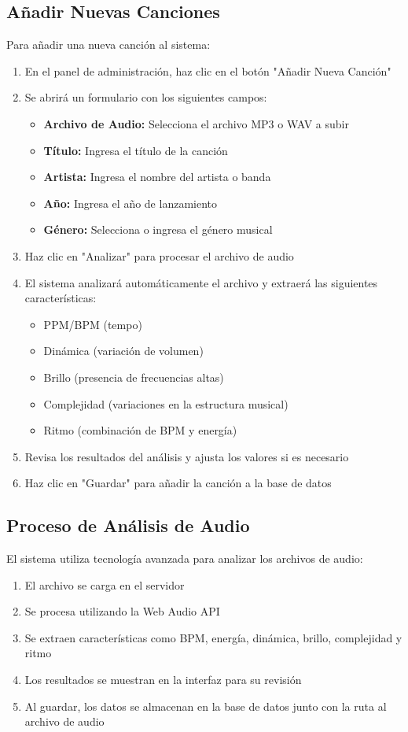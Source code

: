\documentclass[a4paper,12pt]{article}
\begin{document}
\subsection{Añadir Nuevas Canciones}
Para añadir una nueva canción al sistema:
\begin{enumerate}
  \item En el panel de administración, haz clic en el botón "Añadir Nueva Canción"
  \item Se abrirá un formulario con los siguientes campos:
  \begin{itemize}
    \item \textbf{Archivo de Audio:} Selecciona el archivo MP3 o WAV a subir
    \item \textbf{Título:} Ingresa el título de la canción
    \item \textbf{Artista:} Ingresa el nombre del artista o banda
    \item \textbf{Año:} Ingresa el año de lanzamiento
    \item \textbf{Género:} Selecciona o ingresa el género musical
  \end{itemize}
  \item Haz clic en "Analizar" para procesar el archivo de audio
  \item El sistema analizará automáticamente el archivo y extraerá las siguientes características:
  \begin{itemize}
    \item PPM/BPM (tempo)
    \item Dinámica (variación de volumen)
    \item Brillo (presencia de frecuencias altas)
    \item Complejidad (variaciones en la estructura musical)
    \item Ritmo (combinación de BPM y energía)
  \end{itemize}
  \item Revisa los resultados del análisis y ajusta los valores si es necesario
  \item Haz clic en "Guardar" para añadir la canción a la base de datos
\end{enumerate}

\subsection{Proceso de Análisis de Audio}
El sistema utiliza tecnología avanzada para analizar los archivos de audio:
\begin{enumerate}
  \item El archivo se carga en el servidor
  \item Se procesa utilizando la Web Audio API
  \item Se extraen características como BPM, energía, dinámica, brillo, complejidad y ritmo
  \item Los resultados se muestran en la interfaz para su revisión
  \item Al guardar, los datos se almacenan en la base de datos junto con la ruta al archivo de audio
\end{enumerate}
\end{document}
